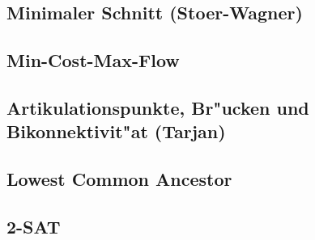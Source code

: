 \subsection{Minimaler Schnitt (Stoer-Wagner)}


\subsection{Min-Cost-Max-Flow}



\subsection{Artikulationspunkte, Br"ucken und Bikonnektivit"at (Tarjan)}



\subsection{Lowest Common Ancestor}



\subsection{2-SAT}



